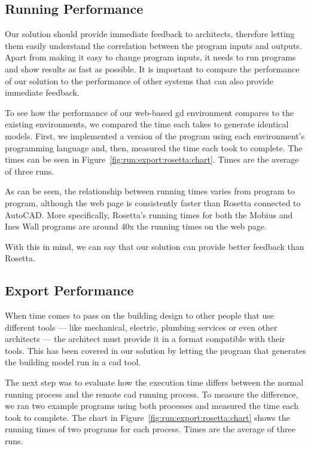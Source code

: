 \subsection{Running Performance}
Our solution should provide immediate feedback to architects, therefore letting them easily understand the correlation between the program inputs and outputs\cite{Leitao2014illustrated}.
Apart from making it easy to change program inputs, it needs to run programs and show results as fast as possible.
It is important to compare the performance of our solution to the performance of other systems that can also provide immediate feedback.

To see how the performance of our web-based \gls{gd} environment compares to the existing environments, we compared the time each takes to generate identical models.
First, we implemented a version of the program using each environment's programming language and, then, measured the time each took to complete.
The times can be seen in Figure~\ref{fig:run:export:rosetta:chart}.
Times are the average of three runs.

As can be seen, the relationship between running times varies from program to program, although the web page is consistently faster than Rosetta connected to AutoCAD.
More specifically, Rosetta's running times for both the Mobius and Ines Wall programs are around 40x the running times on the web page.

With this in mind, we can say that our solution can provide better feedback than Rosetta.



\subsection{Export Performance}
When time comes to pass on the building design to other people that use different tools --- like mechanical, electric, plumbing services or even other architects --- the architect must provide it in a format compatible with their tools.
This has been covered in our solution by letting the program that generates the building model run in a \gls{cad} tool.

The next step was to evaluate how the execution time differs between the normal running process and the remote \gls{cad} running process.
To measure the difference, we ran two example programs using both processes and measured the time each took to complete.
The chart in Figure~\ref{fig:run:export:rosetta:chart} shows the running times of two programs for each process.
Times are the average of three runs.

